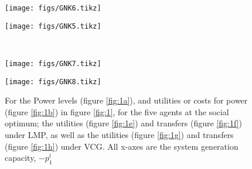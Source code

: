 \begin{figure}[]
	\begin{minipage}[t]{.48\linewidth}
		\texttt{[image: figs/GNK6.tikz]}%
\label{fig:1e}
	\end{minipage}
	\begin{minipage}[t]{.48\linewidth}
		\texttt{[image: figs/GNK5.tikz]}%
\label{fig:1f}
	\end{minipage}
\vspace{5mm}\\
	\begin{minipage}[t]{.48\linewidth}
		\texttt{[image: figs/GNK7.tikz]}%
\label{fig:1g}
	\end{minipage}
	\begin{minipage}[t]{.48\linewidth}
		\texttt{[image: figs/GNK8.tikz]}%
\label{fig:1h}
	\end{minipage}
	\vspace{0.3\baselineskip}
	\caption{For the Power levels (figure \ref{fig:1a}), and utilities or costs for power (figure \ref{fig:1b}) in figure \ref{fig:1}, for the five agents at the social optimum; the utilities (figure \ref{fig:1e}) and transfers (figure \ref{fig:1f}) under LMP, as well as the utilities (figure \ref{fig:1g}) and transfers (figure \ref{fig:1h}) under VCG. All x-axes are the system generation capacity, $-p_1^l$}\label{fig:11}
\end{figure}

